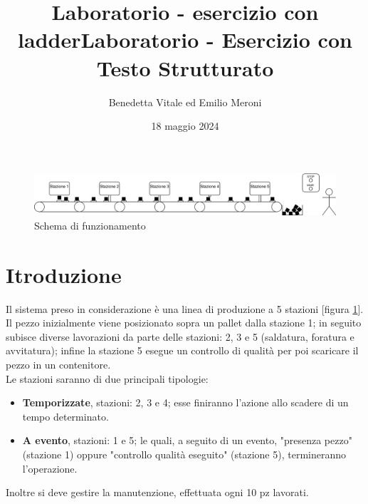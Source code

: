 \documentclass{article}
\title{Laboratorio - esercizio con ladder}
\date{}
\title{Laboratorio - Esercizio con Testo Strutturato}
\author{Benedetta Vitale ed Emilio Meroni}
\date{18 maggio 2024}
\begin{document}
\maketitle

\tableofcontents

\begin{figure}[b]
    \centering
    \includegraphics[width = 1 \linewidth]{Diagrammi/TestoStrutturato-schematico.png}
    \caption{Schema di funzionamento}
    \label{fig:schematico}
\end{figure}
\section{Itroduzione}
Il sistema preso in considerazione è una linea di produzione a 5 stazioni [figura \ref{fig:schematico}].
Il pezzo inizialmente viene posizionato sopra un pallet dalla stazione 1; in seguito subisce diverse lavorazioni da parte delle stazioni: 2, 3 e 5 (saldatura, foratura e avvitatura); infine la stazione 5 esegue un controllo di qualità per poi scaricare il pezzo in un contenitore.
\\

Le stazioni saranno di due principali tipologie:
\begin{itemize}
    \item \textbf{Temporizzate}, stazioni: 2, 3 e 4; esse finiranno l'azione allo scadere di un tempo determinato.
    \item \textbf{A evento}, stazioni: 1 e 5; le quali, a seguito di un evento, "presenza pezzo" (stazione 1) oppure "controllo qualità eseguito" (stazione 5), termineranno l'operazione.
\end{itemize}

Inoltre si deve gestire la manutenzione, effettuata ogni 10 pz lavorati.
\end{document}
